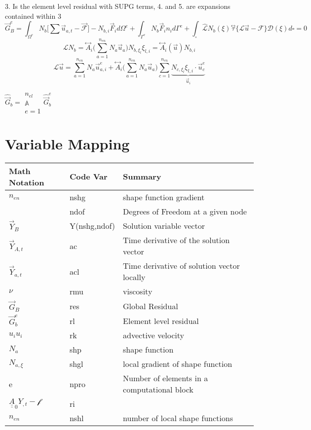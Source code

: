 \documentclass{article}
\begin{document}
3. Is the element level residual with SUPG terms, 4. and 5. are expansions contained within 3
\begin{equation}
\vec{G}_B^e = \int_{\Omega ^e}   N_b \Big[ \sum \vec{u}_{a,t}-\vec{\mathscr{F}}\Big]- N_{b,i} \vec{F}_i d\Omega ^e +\int_
{\Gamma ^e} N_b\vec{F}_in_id\Gamma ^e +\int_\square \hat{\mathscr{L}}N_b(\xi)\overset\leftrightarrow{\tau} \{ \mathscr{L}\vec{u}-\mathscr{F}  \} \mathscr{D}(\xi)d\square=0
\end{equation}
\begin{equation}
\mathscr{L}N_b=\overset\leftrightarrow{A}_i\Big(\sum_{a=1}^{n_{en}}N_a\vec{u}_a\Big)N_{b,\xi_l}\xi_{l,i}=\overset\leftrightarrow{A}_i(\vec{u})N_{b,i}
\end{equation}
\begin{equation}
\mathscr{L}\vec{u}=\sum_{a=1}^{n_{en}}N_a\vec{u}_{a,i}^e+\overset\leftrightarrow{A}_i\Big(\sum_{a=1}^{n_{en}}N_a\vec{u}_a\Big)\sum_{c=1}^{n_{en}}\underbrace{N_{c,\xi_l}\xi_{l,i}\cdot\vec{u}_c^e}_{\vec{u}_i}
\end{equation}

$\hat{\vec{G}}_b=\substack{n_{el}\\ \mathbb{A}\\ {e=1}}\hat{\vec{G}}_b^e$

\section{Variable Mapping}%
\begin{center}
	\begin{tabular}{ | l | l | l |}
		\hline
		Math Notation & Code Var & Summary\\ \hline
		$ n_{en} $ 		& nshg & shape function gradient\\
		 				& ndof & Degrees of Freedom at a given node\\
		$ \vec{Y}_B $ 	& Y(nshg,ndof) & Solution variable vector\\
		$ \vec{Y}_{A,t} $ & ac & Time derivative of the solution vector\\
		$ \vec{Y}_{a,t} $ & acl & Time derivative of solution vector locally\\
		$ \nu $ 		& rmu 	& viscosity\\
		$ \vec{G}_B $   & res 	& Global Residual\\
		$ \vec{G}_b^e $ & rl	& Element level residual\\
		$ u_iu_i $ 		& rk 	& advective velocity\\
		$ N_a $ 		& shp 	& shape function\\
		$ N_{a,\xi} $ 	& shgl 	& local gradient of shape function\\
		e 				& npro 	& Number of elements in a computational block\\
		$ \underline{\underline{A}}_0Y_{,t}-\mathscr{f} $ & ri &\\
		$ n_{en} $ 		& nshl 	& number of local shape functions\\ \hline

	\end{tabular}
\end{center}
\end{document}
